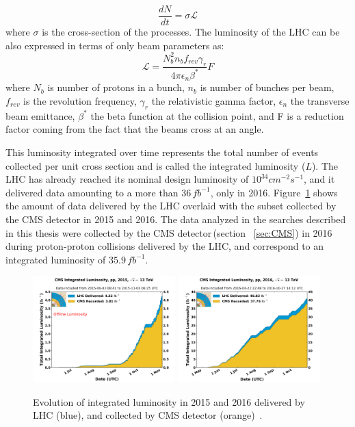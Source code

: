 \begin{equation}
  \frac{dN}{dt}=\sigma\mathscr{L}
\end{equation}
where $\sigma$ is the cross-section of the processes. The luminosity of the LHC can be also expressed in terms of only beam parameters as:
\begin{equation}
  \mathscr{L}=\frac{N_{b}^2 n_{b} f_{rev} \gamma_{r}}{4 \pi \epsilon_{n}\beta^{*}} F
\end{equation}
where $N_{b}$ is number of protons in a bunch, $n_{b}$ is number of bunches per beam, $f_{rev}$ is the revolution frequency, $\gamma_{r}$ the relativistic gamma factor, $\epsilon_{n}$ the transverse beam emittance, $\beta^{*}$ the beta function at the collision point, and F is a reduction factor coming from the fact that the beams cross at an angle.


This luminosity integrated over time represents the total number of events collected per unit cross section and is called the integrated luminosity ($L$). The LHC has already reached its nominal design luminosity of $10^{34} cm^{-2}s^{-1}$, and it delivered data amounting to a more than $36\,fb^{-1}$, only in 2016. Figure~\ref{fig:cms_int_lumi} shows the amount of data delivered by the LHC overlaid with the subset collected by the CMS detector in 2015 and 2016. The data analyzed in the searches described in this thesis were collected by the CMS detector\,(section ~\ref{sec:CMS}) in 2016 during proton-proton collisions delivered by the LHC, and correspond to an integrated luminosity of $35.9\,fb^{-1}$.


\begin{figure}
  \begin{center}
  \captionsetup{width=.95\textwidth,justification=centering}
  \includegraphics[width=0.49\textwidth,keepaspectratio]{plots_and_figures/chapter3/int_lumi_per_day_cumulative_pp_2015.png}
  \includegraphics[width=0.49\textwidth,keepaspectratio]{plots_and_figures/chapter3/int_lumi_per_day_cumulative_pp_2016.png}
\caption{Evolution of integrated luminosity in 2015 and 2016 delivered by LHC (blue), and collected by CMS detector (orange)~\cite{cms_int_lumi_ref}.}
\label{fig:cms_int_lumi}
\end{center}
\end{figure}

